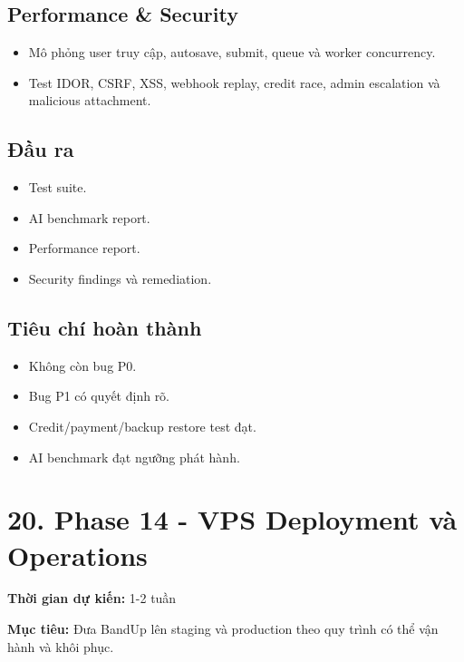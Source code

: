 \documentclass[
  11pt,
  a4paper,
]{article}
\begin{document}
\subsection{Performance \& Security}\label{performance-security}

\begin{itemize}
\item
  Mô phỏng user truy cập, autosave, submit, queue và worker concurrency.
\item
  Test IDOR, CSRF, XSS, webhook replay, credit race, admin escalation và
  malicious attachment.
\end{itemize}

\subsection{Đầu ra}\label{ux111ux1ea7u-ra-13}

\begin{itemize}
\item
  Test suite.
\item
  AI benchmark report.
\item
  Performance report.
\item
  Security findings và remediation.
\end{itemize}

\subsection{Tiêu chí hoàn
thành}\label{tiuxeau-chuxed-houxe0n-thuxe0nh-13}

\begin{itemize}
\item
  Không còn bug P0.
\item
  Bug P1 có quyết định rõ.
\item
  Credit/payment/backup restore test đạt.
\item
  AI benchmark đạt ngưỡng phát hành.
\end{itemize}

\section{20. Phase 14 - VPS Deployment và
Operations}\label{phase-14---vps-deployment-vuxe0-operations}

\textbf{Thời gian dự kiến:} 1-2 tuần

\textbf{Mục tiêu:} Đưa BandUp lên staging và production theo quy trình
có thể vận hành và khôi phục.
\end{document}
